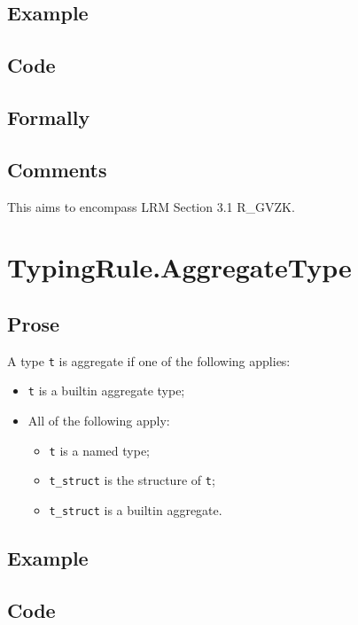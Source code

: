 \documentclass{book}
\begin{document}
    \subsection{Example}

    \subsection{Code}

    \subsection{Formally}

    \subsection{Comments}
    This aims to encompass LRM Section 3.1 R\_GVZK.

\section{TypingRule.AggregateType}

    \subsection{Prose}
    A type \texttt{t} is aggregate if one of the following applies:
    \begin{itemize}
    \item \texttt{t} is a builtin aggregate type;
    \item All of the following apply:
      \begin{itemize}
      \item \texttt{t} is a named type;
      \item \texttt{t\_struct} is the structure of \texttt{t};
      \item \texttt{t\_struct} is a builtin aggregate. 
      \end{itemize}
    \end{itemize}

    \subsection{Example}

    \subsection{Code}
\end{document}
